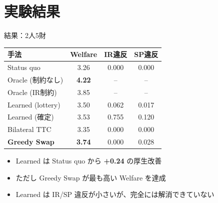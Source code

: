 \documentclass[aspectratio=169,12pt]{beamer}
\begin{document}
\section{実験結果}

\begin{frame}{結果：2人5財}
\begin{table}[h]
\centering
\small
\begin{tabular}{lccc}
\toprule
手法 & Welfare & IR違反 & SP違反 \\
\midrule
Status quo & 3.26 & 0.000 & 0.000 \\
Oracle (制約なし) & \textbf{4.22} & -- & -- \\
Oracle (IR制約) & 3.85 & -- & -- \\
\midrule
Learned (lottery) & 3.50 & 0.062 & 0.017 \\
Learned (確定) & 3.53 & 0.755 & 0.120 \\
Bilateral TTC & 3.35 & 0.000 & 0.000 \\
\textbf{Greedy Swap} & \textbf{3.74} & 0.000 & 0.028 \\
\bottomrule
\end{tabular}
\end{table}

\vspace{0.3cm}
\begin{itemize}
    \item Learned は Status quo から \textbf{+0.24} の厚生改善
    \item ただし Greedy Swap が最も高い Welfare を達成
    \item Learned は IR/SP 違反が小さいが、完全には解消できていない
\end{itemize}
\end{frame}
\end{document}
